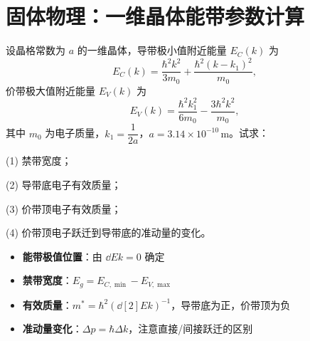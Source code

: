 \section{固体物理：一维晶体能带参数计算}
\label{sec:1d-band-params}

\begin{modelbox}[题目：一维晶体的禁带宽度与有效质量]
设晶格常数为 $a$ 的一维晶体，导带极小值附近能量 $E_C(k)$ 为
\[
E_C(k)=\frac{\hbar^2k^2}{3m_0}+\frac{\hbar^2(k-k_1)^2}{m_0},
\]
价带极大值附近能量 $E_V(k)$ 为
\[
E_V(k)=\frac{\hbar^2k_1^2}{6m_0}-\frac{3\hbar^2k^2}{m_0},
\]
其中 $m_0$ 为电子质量，$k_1=\dfrac{1}{2a}$，$a=3.14\times10^{-10}\,\text{m}$。试求：

(1) 禁带宽度；

(2) 导带底电子有效质量；

(3) 价带顶电子有效质量；

(4) 价带顶电子跃迁到导带底的准动量的变化。
\end{modelbox}

\begin{tipbox}[考点快速分析]
\begin{itemize}
    \item \textbf{能带极值位置}：由 $\dd{E}{k}=0$ 确定
    \item \textbf{禁带宽度}：$E_g=E_{C,\min}-E_{V,\max}$
    \item \textbf{有效质量}：$m^*=\hbar^2\left(\dd[2]{E}{k}\right)^{-1}$，导带底为正，价带顶为负
    \item \textbf{准动量变化}：$\Delta p=\hbar\Delta k$，注意直接/间接跃迁的区别
\end{itemize}
\end{tipbox}

